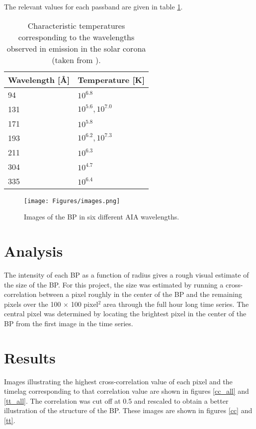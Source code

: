 \documentclass[preprint2]{aastex}
\begin{document}
The relevant values for each passband are given in table \ref{temps}.
\begin{table}[h]
\centering
    \begin{tabular}{l l}
        \hline\hline
        Wavelength [\AA{}] & Temperature [K] \\
        \hline
        94 & $10^{6.8}$ \\
        131 & $10^{5.6}, 10^{7.0}$ \\
        171 & $10^{5.8}$ \\
        193 & $10^{6.2}, 10^{7.3}$ \\
        211 & $10^{6.3}$ \\
        304 & $10^{4.7}$ \\
        335 & $10^{6.4}$ \\
    \end{tabular}
\caption{Characteristic temperatures corresponding to the wavelengths observed
    in emission in the solar corona (taken from \cite{Lemen}).}
\label{temps}
\end{table}

\begin{figure*}[htb!]
    \texttt{[image: Figures/images.png]}
    \caption{Images of the BP in six different AIA wavelengths.}
    \label{full}
\end{figure*}

\section{Analysis}\label{analysis}
The intensity of each BP as a function of radius gives a rough visual estimate
of the size of the BP.
For this project, the size was estimated by running a cross-correlation between
a pixel roughly in the center of the BP and the remaining pixels over the
100 $\times$ 100 pixel$^{2}$ area through the full hour long time series.
The central pixel was determined by locating the brightest pixel in the center
of the BP from the first image in the time series.

\section{Results}\label{results}
Images illustrating the highest cross-correlation value of each pixel and the
timelag corresponding to that correlation value are shown in figures \ref{cc_all}
and \ref{tt_all}. The correlation was cut off at 0.5 and rescaled to obtain a
better illustration of the structure of the BP. These images are shown in
figures \ref{cc} and \ref{tt}.
\end{document}
